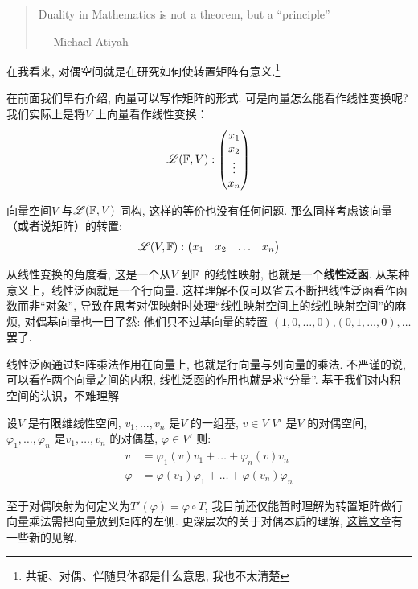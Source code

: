 \begin{quote}
    Duality in Mathematics is not a theorem, but a ``principle''

    \hfill --- Michael Atiyah
\end{quote}

在我看来, 对偶空间就是在研究如何使转置矩阵有意义.\footnote{共轭、对偶、伴随具体都是什么意思,
我也不太清楚}

在前面我们早有介绍, 向量可以写作矩阵的形式. 可是向量怎么能看作线性变换呢? 我们实际上是将\(V\)
上向量看作线性变换：\[
    \mathscr{L}(\mathbb{F},V):
    \begin{pmatrix}
        x_1 \\
        x_2 \\
        \vdots \\
        x_n
    \end{pmatrix}
\]

向量空间\(V\) 与\(\mathscr{L}(\mathbb{F},V)\) 同构, 这样的等价也没有任何问题.
那么同样考虑该向量（或者说矩阵）的转置:
\[
    \mathscr{L}(V,\mathbb{F}):
    \begin{pmatrix}
        x_1 & x_2 & \dots & x_n
    \end{pmatrix}
\]

从线性变换的角度看, 这是一个从\(V\) 到\(\mathbb{F}\) 的线性映射, 也就是一个\textbf{线性泛函}.
从某种意义上，线性泛函就是一个行向量. 这样理解不仅可以省去不断把线性泛函看作函数而非``对象'',
导致在思考对偶映射时处理``线性映射空间上的线性映射空间''的麻烦, 对偶基向量也一目了然:
他们只不过基向量的转置 \((1,0,\dots ,0)\),\((0,1,\dots ,0),\dots \) 罢了.

线性泛函通过矩阵乘法作用在向量上, 也就是行向量与列向量的乘法. 不严谨的说, 可以看作两个向量之间的内积,
线性泛函的作用也就是求``分量''. 基于我们对内积空间的认识，不难理解
\begin{theorem}
    设\(V\) 是有限维线性空间, \(v_{1}, \dots ,v_{n}\) 是\(V\) 的一组基, \(v \in V\)
    \(V'\) 是\(V\) 的对偶空间, \(\varphi_{1}, \dots ,\varphi_{n}\)
    是\(v_{1}, \dots ,v_{n}\) 的对偶基, \(\varphi \in V'\)
    则:
    \begin{align*}
        v &= \varphi_{1}(v)v_{1} + \dots + \varphi_{n}(v)v_{n} \\
        \varphi &= \varphi(v_{1})\varphi_{1} + \dots +
        \varphi(v_{n})\varphi_{n}
    \end{align*}
\end{theorem}

至于对偶映射为何定义为\(T'(\varphi)=\varphi \circ T\),
我目前还仅能暂时理解为转置矩阵做行向量乘法需把向量放到矩阵的左侧. 更深层次的关于对偶本质的理解,
\href{https://www.zhihu.com/question/38464481/answer/2110009942}{这篇文章}有一些新的见解.